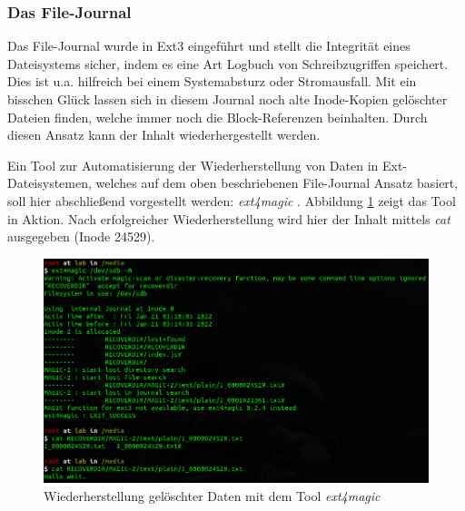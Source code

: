 \subsubsection{Das File-Journal}

Das File-Journal wurde in Ext3 eingeführt und stellt die Integrität eines Dateisystems sicher, indem es eine Art Logbuch von Schreibzugriffen speichert. Dies ist u.a. hilfreich bei einem Systemabsturz oder Stromausfall. Mit ein bisschen Glück lassen sich in diesem Journal noch alte Inode-Kopien gelöschter Dateien finden, welche immer noch die Block-Referenzen beinhalten. Durch diesen Ansatz kann der Inhalt wiederhergestellt werden.

Ein Tool zur Automatisierung der Wiederherstellung von Daten in Ext-Dateisystemen, welches auf dem oben beschriebenen File-Journal Ansatz basiert, soll hier abschließend vorgestellt werden: \textit{ext4magic} \cite{Ext4magic.07.01.2022}.
Abbildung \ref{fig:ext4magic} zeigt das Tool in Aktion. Nach erfolgreicher Wiederherstellung wird hier der Inhalt mittels \textit{cat} ausgegeben (Inode 24529).

\begin{figure}[H]
	\centering
	\includegraphics[width=12cm,keepaspectratio=true]{pictures/ext4magic-recovery.png}
	\caption{
		Wiederherstellung gelöschter Daten mit dem Tool \textit{ext4magic} \cite{Ext4magic.07.01.2022}
	}
	\label{fig:ext4magic}
\end{figure}